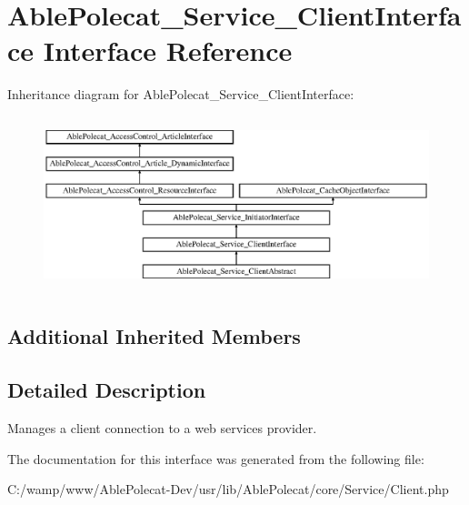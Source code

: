 \hypertarget{interface_able_polecat___service___client_interface}{}\section{Able\+Polecat\+\_\+\+Service\+\_\+\+Client\+Interface Interface Reference}
\label{interface_able_polecat___service___client_interface}
Inheritance diagram for Able\+Polecat\+\_\+\+Service\+\_\+\+Client\+Interface\+:\begin{figure}[H]
\begin{center}
\leavevmode
\includegraphics[height=5.121951cm]{interface_able_polecat___service___client_interface}
\end{center}
\end{figure}
\subsection*{Additional Inherited Members}


\subsection{Detailed Description}
Manages a client connection to a web services provider. 

The documentation for this interface was generated from the following file\+:\begin{DoxyCompactItemize}
\item 
C\+:/wamp/www/\+Able\+Polecat-\/\+Dev/usr/lib/\+Able\+Polecat/core/\+Service/Client.\+php\end{DoxyCompactItemize}
